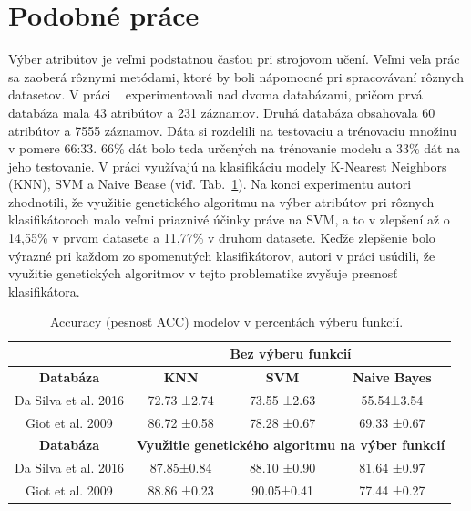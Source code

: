\documentclass[runningheads]{llncs}
\begin{document}
\section{Podobné práce}

Výber atribútov je veľmi podstatnou časťou pri strojovom učení. Veľmi veľa prác sa 
zaoberá rôznymi metódami, ktoré by boli nápomocné pri spracovávaní rôznych datasetov.
V práci ~\cite{ref_nascimento} experimentovali nad dvoma databázami, pričom 
prvá databáza mala 43 atribútov a 231 záznamov. Druhá databáza obsahovala 60 atribútov 
a 7555 záznamov. Dáta si rozdelili na testovaciu a trénovaciu množinu v pomere 66:33. 
66\% dát bolo teda určených na trénovanie modelu a 33\% dát na jeho testovanie. 
V práci využívajú na klasifikáciu modely K-Nearest Neighbors (KNN), SVM a Naive Bease 
(viď. Tab.~\ref{tab_vyber_funkci}). Na konci experimentu autori zhodnotili, 
že využitie genetického algoritmu na výber atribútov pri rôznych klasifikátoroch malo veľmi priaznivé
účinky práve na SVM, a to v zlepšení až o 14,55\% v prvom datasete a 11,77\% v druhom datasete.
Keďže zlepšenie bolo výrazné pri každom zo spomenutých klasifikátorov, autori v práci usúdili, že
využitie genetických algoritmov v tejto problematike zvyšuje presnosť klasifikátora.

\begin{table}[]
\centering
\caption{Accuracy (pesnosť ACC) modelov v percentách výberu funkcií.~\cite{ref_nascimento}}\label{tab_vyber_funkci}
\begin{tabular}{|c|c|c|c|}
\hline
                     & \multicolumn{3}{c|}{\textbf{Bez výberu funkcií}}                     \\ \hline
\textbf{Databáza}    & \textbf{KNN}          & \textbf{SVM}          & \textbf{Naive Bayes} \\ \hline
Da Silva et al. 2016 & 72.73 ±2.74           & 73.55 ±2.63           & 55.54±3.54           \\ \hline
Giot et al. 2009     & 86.72 ±0.58           & 78.28 ±0.67           & 69.33 ±0.67          \\ \hline
\textbf{Databáza}    & \multicolumn{3}{c|}{\textbf{Využitie genetického algoritmu na výber funkcií}} \\ \hline
Da Silva et al. 2016 & 87.85±0.84            & 88.10 ±0.90           & 81.64 ±0.97          \\ \hline
Giot et al. 2009     & 88.86 ±0.23           & 90.05±0.41            & 77.44 ±0.27          \\ \hline
\end{tabular}
\end{table}
\end{document}

